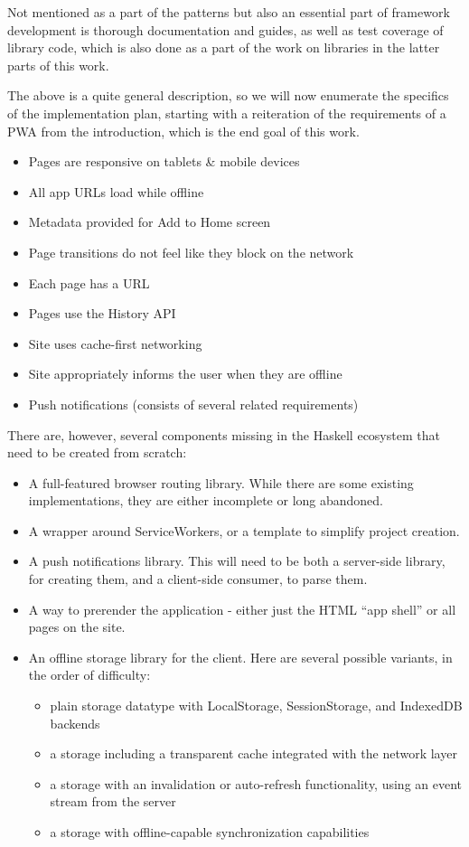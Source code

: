 \documentclass[english,odsaz]{fitthesis}
\begin{document}
Not mentioned as a part of the patterns but also an essential part of framework
development is thorough documentation and guides, as well as test coverage of
library code, which is also done as a part of the work on libraries in the
latter parts of this work.

The above is a quite general description, so we will now enumerate the specifics of the
implementation plan, starting with a reiteration of the requirements of a PWA
from the introduction, which is the end goal of this work.

\begin{itemize}
\item Pages are responsive on tablets \& mobile devices
\item All app URLs load while offline
\item Metadata provided for Add to Home screen
\item Page transitions do not feel like they block on the network
\item Each page has a URL
\item Pages use the History API
\item Site uses cache-first networking
\item Site appropriately informs the user when they are offline
\item Push notifications (consists of several related requirements)
\end{itemize}

There are, however, several components missing in the Haskell ecosystem that
need to be created from scratch:
\begin{itemize}
\item A full-featured browser routing library. While there are some existing
implementations, they are either incomplete or long abandoned.
\item A wrapper around ServiceWorkers, or a template to simplify project creation.
\item A push notifications library. This will need to be both a server-side library,
for creating them, and a client-side consumer, to parse them.
\item A way to prerender the application - either just the HTML ``app shell'' or all
pages on the site.
\item An offline storage library for the client. Here are several possible variants,
in the order of difficulty:
\begin{itemize}
\item plain storage datatype with LocalStorage, SessionStorage, and IndexedDB backends
\item a storage including a transparent cache integrated with the network layer
\item a storage with an invalidation or auto-refresh functionality, using an event
stream from the server
\item a storage with offline-capable synchronization capabilities
\end{itemize}
\end{itemize}
\end{document}
